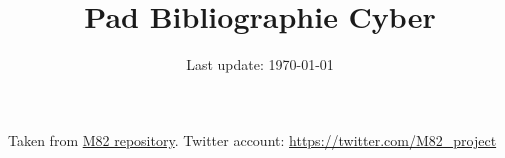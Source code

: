 \documentclass[12pt,a4paper]{article}
\author{Last update: \today}
\title{Pad Bibliographie Cyber}
\date{}
\begin{document}
\maketitle
\thispagestyle{empty}
Taken from \href{https://github.com/M82-project/Bibliography}{M82 repository}. Twitter account: \url{https://twitter.com/M82_project}\nocite{*}
\renewcommand{\thepage}{}


\end{document}

